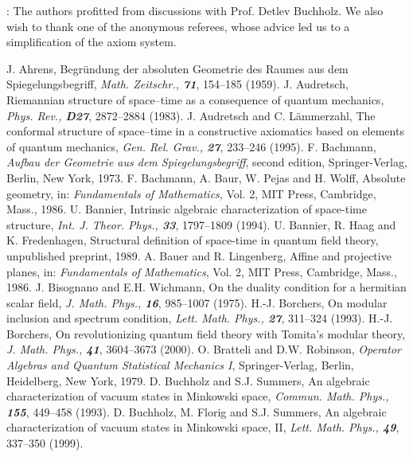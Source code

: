 \documentclass[a4paper,twoside,12pt]{article}
\begin{document}
     

\bigskip

:  The authors profitted from discussions
with Prof. Detlev Buchholz. We also wish to thank one of the anonymous
referees, whose advice led us to a simplification of the axiom system. \\


\begin{thebibliography}{Bor}
J. Ahrens, Begr\"undung der absoluten Geometrie des Raumes aus dem
Spiegelungsbegriff, {\sl Math. Zeitschr., \bf 71}, 154--185 (1959).
J. Audretsch, Riemannian structure of space--time as a 
consequence of quantum mechanics, {\sl Phys. Rev., \bf D27}, 2872--2884
(1983).
J. Audretsch and C. L\"ammerzahl, The conformal structure
of space--time in a constructive axiomatics based on elements of
quantum mechanics, {\sl Gen. Rel. Grav., \bf 27}, 233--246 (1995).
F. Bachmann, {\it Aufbau der Geometrie aus dem Spiegelungsbegriff},
second edition, Springer-Verlag, Berlin, New York, 1973.
F. Bachmann, A. Baur, W. Pejas and H. Wolff, Absolute
geometry, in: {\it Fundamentals of Mathematics}, Vol. 2, MIT Press, 
Cambridge, Mass., 1986.
U. Bannier, Intrinsic algebraic characterization of space-time 
structure, {\sl Int. J. Theor. Phys., \bf 33}, 1797--1809 (1994). 
U. Bannier, R. Haag and K. Fredenhagen, Structural definition of
space-time in quantum field theory, unpublished preprint, 1989.
A. Bauer and R. Lingenberg, Affine and projective planes, in:
{\it Fundamentals of Mathematics}, Vol. 2, MIT Press, Cambridge, Mass., 1986.
J. Bisognano and E.H. Wichmann, On the duality condition for a 
hermitian scalar field, {\sl J. Math. Phys., \bf 16}, 985--1007 (1975).
H.-J. Borchers, On modular inclusion and spectrum condition, 
{\sl Lett. Math. Phys., \bf 27}, 311--324 (1993).
H.-J. Borchers, On revolutionizing quantum field theory with 
Tomita's modular theory, {\sl J. Math. Phys., \bf 41}, 3604--3673 (2000).
O. Bratteli and D.W. Robinson, {\it Operator Algebras and
Quantum Statistical Mechanics I}, Springer-Verlag, Berlin, Heidelberg, 
New York, 1979.
D. Buchholz and S.J. Summers, An algebraic characterization of 
vacuum states in Minkowski space, {\sl Commun. Math. Phys., \bf 155}, 
449--458 (1993).
D. Buchholz, M. Florig and S.J. Summers, An algebraic 
characterization of vacuum states in Minkowski space, II, {\sl Lett. Math.
Phys., \bf 49}, 337--350 (1999).

\end{thebibliography}
\end{document}
